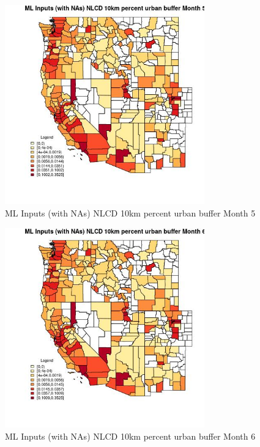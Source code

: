 \clearpage 

\begin{figure} 
\centering  
\includegraphics[width=0.77\textwidth]{Code_Outputs/Report_ML_input_PM25_Step4_part_e_de_duplicated_aves_compiled_2019-05-21wNAs_CountyNLCD_10km_percent_urban_buffermedianMonth5.jpg} 
\caption{\label{fig:Report_ML_input_PM25_Step4_part_e_de_duplicated_aves_compiled_2019-05-21wNAsCountyNLCD_10km_percent_urban_buffermedianMonth5}ML Inputs (with NAs) NLCD 10km percent urban buffer Month 5} 
\end{figure} 
 

\begin{figure} 
\centering  
\includegraphics[width=0.77\textwidth]{Code_Outputs/Report_ML_input_PM25_Step4_part_e_de_duplicated_aves_compiled_2019-05-21wNAs_CountyNLCD_10km_percent_urban_buffermedianMonth6.jpg} 
\caption{\label{fig:Report_ML_input_PM25_Step4_part_e_de_duplicated_aves_compiled_2019-05-21wNAsCountyNLCD_10km_percent_urban_buffermedianMonth6}ML Inputs (with NAs) NLCD 10km percent urban buffer Month 6} 
\end{figure} 
 

